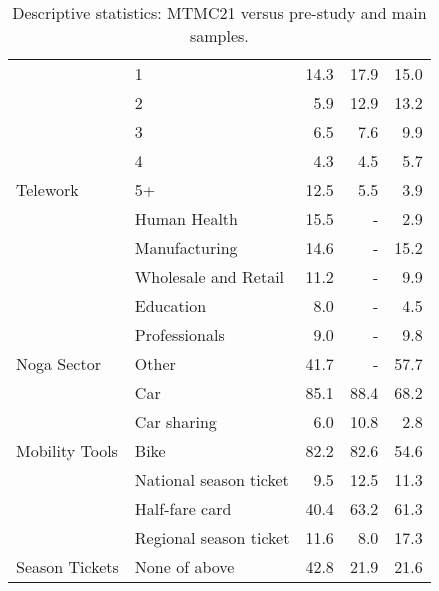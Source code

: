 \begin{table}
{\begin{tabular}{llrrr}
& 1 & 14.3 & 17.9 & 15.0\\
& 2 & 5.9 & 12.9 & 13.2\\
& 3 & 6.5 & 7.6 & 9.9\\
& 4 & 4.3 & 4.5 & 5.7\\
\multirow[t]{-6}{*}{\raggedright\arraybackslash Telework} & 5+ & 12.5 & 5.5 & 3.9\\
& Human Health & 15.5 & - & 2.9\\
& Manufacturing & 14.6 & - & 15.2\\
& Wholesale and Retail & 11.2 & - & 9.9\\
& Education & 8.0 & - & 4.5\\
& Professionals & 9.0 & - & 9.8\\
\multirow[t]{-6}{*}{\raggedright\arraybackslash Noga Sector} & Other & 41.7 & - & 57.7\\
& Car & 85.1 & 88.4 & 68.2\\
& Car sharing & 6.0 & 10.8 & 2.8\\
\multirow[t]{-3}{*}{\raggedright\arraybackslash Mobility Tools} & Bike & 82.2 & 82.6 & 54.6\\
& National season ticket & 9.5 & 12.5 & 11.3\\
& Half-fare card & 40.4 & 63.2 & 61.3\\
& Regional season ticket & 11.6 & 8.0 & 17.3\\
\multirow[t]{-4}{*}{\raggedright\arraybackslash Season Tickets} & None of above & 42.8 & 21.9 & 21.6\\
\bottomrule
\end{tabular}%
}
\caption{\label{tab:mzmv-marginals} Descriptive statistics: MTMC21 versus pre-study and main samples.}
\end{table}
